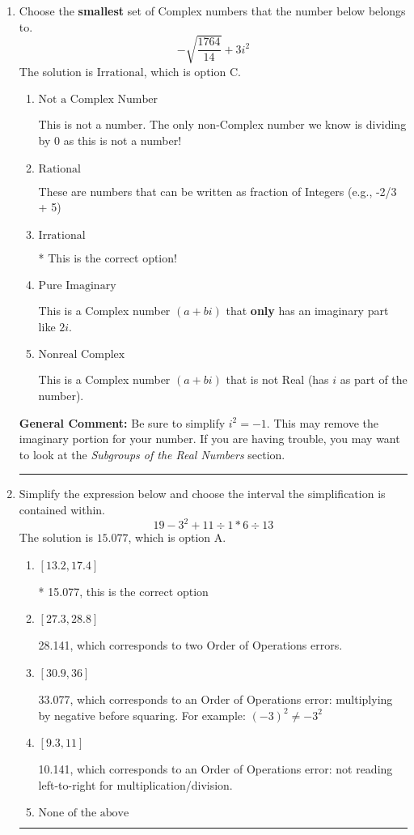 \documentclass{extbook}[14pt]
\newcommand{\litem}[1]{\item #1

\rule{\textwidth}{0.4pt}}
\begin{document}
\begin{enumerate}\litem{
Choose the \textbf{smallest} set of Complex numbers that the number below belongs to.
\[ -\sqrt{\frac{1764}{14}}+3i^2 \]The solution is \( \text{Irrational} \), which is option C.\begin{enumerate}[label=\Alph*.]
\item \( \text{Not a Complex Number} \)

This is not a number. The only non-Complex number we know is dividing by 0 as this is not a number!
\item \( \text{Rational} \)

These are numbers that can be written as fraction of Integers (e.g., -2/3 + 5)
\item \( \text{Irrational} \)

* This is the correct option!
\item \( \text{Pure Imaginary} \)

This is a Complex number $(a+bi)$ that \textbf{only} has an imaginary part like $2i$.
\item \( \text{Nonreal Complex} \)

This is a Complex number $(a+bi)$ that is not Real (has $i$ as part of the number).
\end{enumerate}

\textbf{General Comment:} Be sure to simplify $i^2 = -1$. This may remove the imaginary portion for your number. If you are having trouble, you may want to look at the \textit{Subgroups of the Real Numbers} section.
}
\litem{
Simplify the expression below and choose the interval the simplification is contained within.
\[ 19 - 3^2 + 11 \div 1 * 6 \div 13 \]The solution is \( 15.077 \), which is option A.\begin{enumerate}[label=\Alph*.]
\item \( [13.2, 17.4] \)

* 15.077, this is the correct option
\item \( [27.3, 28.8] \)

 28.141, which corresponds to two Order of Operations errors.
\item \( [30.9, 36] \)

 33.077, which corresponds to an Order of Operations error: multiplying by negative before squaring. For example: $(-3)^2 \neq -3^2$
\item \( [9.3, 11] \)

 10.141, which corresponds to an Order of Operations error: not reading left-to-right for multiplication/division.
\item \( \text{None of the above} \)


\end{enumerate}}
\end{enumerate}
\end{document}
